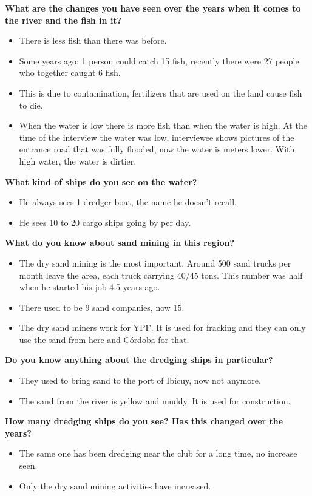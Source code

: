 \textbf{What are the changes you have seen over the years when it comes to the river and the fish in it?}
\begin{itemize}
    \item There is less fish than there was before.
    \item Some years ago: 1 person could catch 15 fish, recently there were 27 people who together caught 6 fish.
    \item This is due to contamination, fertilizers that are used on the land cause fish to die.
    \item When the water is low there is more fish than when the water is high. At the time of the interview the water was low, interviewee shows pictures of the entrance road that was fully flooded, now the water is meters lower. With high water, the water is dirtier.
\end{itemize}

\textbf{What kind of ships do you see on the water?}
\begin{itemize}
    \item He always sees 1 dredger boat, the name he doesn't recall.
    \item He sees 10 to 20 cargo ships going by per day.
\end{itemize}

\textbf{What do you know about sand mining in this region?}
\begin{itemize}
    \item The dry sand mining is the most important. Around 500 sand trucks per month leave the area, each truck carrying 40/45 tons. This number was half when he started his job 4.5 years ago.
    \item There used to be 9 sand companies, now 15.
    \item The dry sand miners work for YPF. It is used for fracking and they can only use the sand from here and Córdoba for that.
\end{itemize}

\textbf{Do you know anything about the dredging ships in particular?}
\begin{itemize}
    \item They used to bring sand to the port of Ibicuy, now not anymore.
    \item The sand from the river is yellow and muddy. It is used for construction.
\end{itemize}

\textbf{How many dredging ships do you see? Has this changed over the years? }
\begin{itemize}
    \item The same one has been dredging near the club for a long time, no increase seen.
    \item Only the dry sand mining activities have increased.
\end{itemize}

